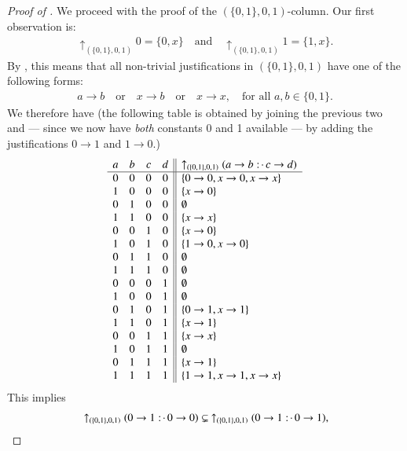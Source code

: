 \documentclass[11pt]{amsart}
\theoremstyle{definition} %
\newcommand{\righttherefore}{:\joinrel\cdot\,}
\begin{document}
\begin{proof}[Proof of ]
We proceed with the proof of the $(\{0,1\},0,1)$-column. Our first observation is:
\begin{align*} 
	\uparrow_{(\{0,1\},0,1)} 0=\{0,x\} \quad\text{and}\quad \uparrow_{(\{0,1\},0,1)} 1=\{1,x\}.
\end{align*} By , this means that all non-trivial justifications in $(\{0,1\},0,1)$ have one of the following forms:
\begin{align*} 
	a\to b \quad\text{or}\quad x\to b \quad\text{or}\quad x\to x,\quad\text{for all $a,b\in\{0,1\}$.}
\end{align*} We therefore have (the following table is obtained by joining the previous two and --- since we now have \textit{both} constants 0 and 1 available --- by adding the justifications $0\to 1$ and $1\to 0$.)
\begin{align*}
\begin{array}{cccc||l}
	a & b & c & d & \uparrow_{(\{0,1\},0,1)}(a\to b\righttherefore c\to d)\\
	\hline
	0 & 0 & 0 & 0 & \{0\to 0,x\to 0,x\to x\}\\
	1 & 0 & 0 & 0 & \{x\to 0\}\\
	0 & 1 & 0 & 0 & \emptyset\\ %
	1 & 1 & 0 & 0 & \{x\to x\}\\
	0 & 0 & 1 & 0 & \{x\to 0\}\\
	1 & 0 & 1 & 0 & \{1\to 0,x\to 0\}\\
	0 & 1 & 1 & 0 & \emptyset\\
	1 & 1 & 1 & 0 & \emptyset\\ %
	0 & 0 & 0 & 1 & \emptyset\\ %
	1 & 0 & 0 & 1 & \emptyset\\
	0 & 1 & 0 & 1 & \{0\to 1,x\to 1\}\\
	1 & 1 & 0 & 1 & \{x\to 1\}\\
	0 & 0 & 1 & 1 & \{x\to x\}\\
	1 & 0 & 1 & 1 & \emptyset\\ %
	0 & 1 & 1 & 1 & \{x\to 1\}\\
	1 & 1 & 1 & 1 &\{1\to 1,x\to 1,x\to x\}
\end{array}
\end{align*} This implies
\begin{align*} 
	&\uparrow_{(\{0,1\},0,1)}(0\to 1\righttherefore 0\to 0)\subsetneq\ \uparrow_{(\{0,1\},0,1)}(0\to 1\righttherefore 0\to 1),\\

\end{align*}
\end{proof}
\end{document}
